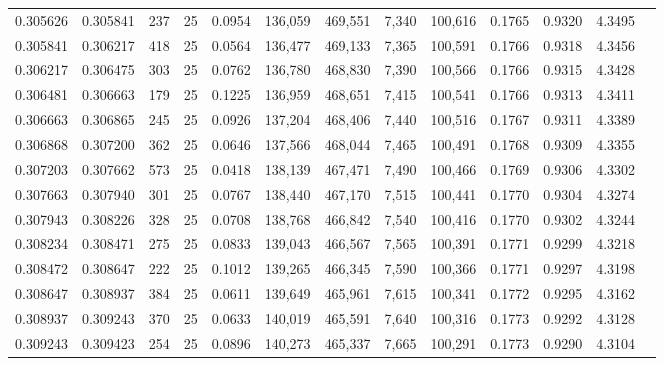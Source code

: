 \begin{tabular}{rrrrrrrrrrrrr}
0.305626 & 0.305841 &   237 &  25 &                                     0.0954 & 136,059 & 469,551 &   7,340 & 100,616 & 0.1765 & 0.9320 & 4.3495 \\
0.305841 & 0.306217 &   418 &  25 &                                     0.0564 & 136,477 & 469,133 &   7,365 & 100,591 & 0.1766 & 0.9318 & 4.3456 \\
0.306217 & 0.306475 &   303 &  25 &                                     0.0762 & 136,780 & 468,830 &   7,390 & 100,566 & 0.1766 & 0.9315 & 4.3428 \\
0.306481 & 0.306663 &   179 &  25 &                                     0.1225 & 136,959 & 468,651 &   7,415 & 100,541 & 0.1766 & 0.9313 & 4.3411 \\
0.306663 & 0.306865 &   245 &  25 &                                     0.0926 & 137,204 & 468,406 &   7,440 & 100,516 & 0.1767 & 0.9311 & 4.3389 \\
0.306868 & 0.307200 &   362 &  25 &                                     0.0646 & 137,566 & 468,044 &   7,465 & 100,491 & 0.1768 & 0.9309 & 4.3355 \\
0.307203 & 0.307662 &   573 &  25 &                                     0.0418 & 138,139 & 467,471 &   7,490 & 100,466 & 0.1769 & 0.9306 & 4.3302 \\
0.307663 & 0.307940 &   301 &  25 &                                     0.0767 & 138,440 & 467,170 &   7,515 & 100,441 & 0.1770 & 0.9304 & 4.3274 \\
0.307943 & 0.308226 &   328 &  25 &                                     0.0708 & 138,768 & 466,842 &   7,540 & 100,416 & 0.1770 & 0.9302 & 4.3244 \\
0.308234 & 0.308471 &   275 &  25 &                                     0.0833 & 139,043 & 466,567 &   7,565 & 100,391 & 0.1771 & 0.9299 & 4.3218 \\
0.308472 & 0.308647 &   222 &  25 &                                     0.1012 & 139,265 & 466,345 &   7,590 & 100,366 & 0.1771 & 0.9297 & 4.3198 \\
0.308647 & 0.308937 &   384 &  25 &                                     0.0611 & 139,649 & 465,961 &   7,615 & 100,341 & 0.1772 & 0.9295 & 4.3162 \\
0.308937 & 0.309243 &   370 &  25 &                                     0.0633 & 140,019 & 465,591 &   7,640 & 100,316 & 0.1773 & 0.9292 & 4.3128 \\
0.309243 & 0.309423 &   254 &  25 &                                     0.0896 & 140,273 & 465,337 &   7,665 & 100,291 & 0.1773 & 0.9290 & 4.3104 \\

\end{tabular}
